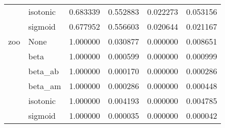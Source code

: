 \begin{tabular}{llrrrr}
        & isotonic &  0.683339 &  0.552883 &  0.022273 &  0.053156 \\
        & sigmoid &  0.677952 &  0.556603 &  0.020644 &  0.021167 \\
zoo & None &  1.000000 &  0.030877 &  0.000000 &  0.008651 \\
        & beta &  1.000000 &  0.000599 &  0.000000 &  0.000999 \\
        & beta\_ab &  1.000000 &  0.000170 &  0.000000 &  0.000286 \\
        & beta\_am &  1.000000 &  0.000286 &  0.000000 &  0.000448 \\
        & isotonic &  1.000000 &  0.004193 &  0.000000 &  0.004785 \\
        & sigmoid &  1.000000 &  0.000035 &  0.000000 &  0.000042 \\
\bottomrule
\end{tabular}
